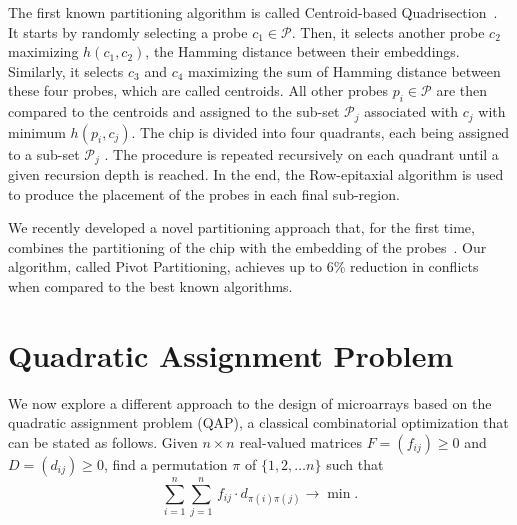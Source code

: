 \documentclass[english]{lni}
\newcommand{\ignore}[1]{}
\begin{document}
The first known partitioning algorithm is called Centroid-based
Quadrisection~\cite{KAHNG03B}. It starts by randomly selecting a probe
$c_1 \in \mathcal{P}$. Then, it selects another probe $c_2$ maximizing
$h(c_1,c_2)$, the Hamming distance between their embeddings. Similarly, it
selects $c_3$ and $c_4$ maximizing the sum of Hamming distance between these
four probes, which are called centroids. All other probes $p_i \in \mathcal{P}$
are then compared to the centroids and assigned to the sub-set $\mathcal{P}_j$
associated with $c_j$ with minimum $h(p_i,c_j)$. The chip is divided into four
quadrants, each being assigned to a sub-set $\mathcal{P}_j$ .  The procedure
is repeated recursively on each quadrant until a given recursion depth is
reached. In the end, the Row-epitaxial algorithm is used to produce the
placement of the probes in each final sub-region.

We recently developed a novel partitioning approach that, for the first
time, combines the partitioning of the chip with the embedding of the
probes~\cite{CARVALHO06}. Our algorithm, called Pivot Partitioning, achieves
up to 6\% reduction in conflicts when compared to the best known algorithms.

\ignore{
Their results show that the running time of the row-epitaxial algorithm
drops significantly with increasing recursion depth. The time required to place
the probes of a 500\,x\,500 chip, for instance, dropped by 69\% with $L = 3$
when compared with the time required by the row-epitaxial without any
partitioning.
It is not clear from their experiments, however, how the choice of $L$ impaired
the performance of the row-epitaxial algorithm in terms of solution quality
since they have restricted their experiments to $L \leq 3$. Moreover, there is
no clear trend toward reduction or increase in border length as $L$ varies
from~0 to~3.
}

\section{Quadratic Assignment Problem}
\label{sec:qap}

We now explore a different approach to the design of microarrays based on the
quadratic assignment problem (QAP), a classical combinatorial optimization
that can be stated as follows. Given $n \times n$ real-valued matrices $F =
(f_{ij})\geq 0$ and $D = (d_{ij})\geq 0$, find a permutation $\pi$ of $\{1, 2,
\ldots n\}$ such that
\begin{equation}\label{eq:qap_def}
  \sum_{i=1}^{n} \sum_{j=1}^{n}\,  f_{ij} \cdot d_{\pi(i)\pi(j)} \to \min.
\end{equation}
\end{document}
